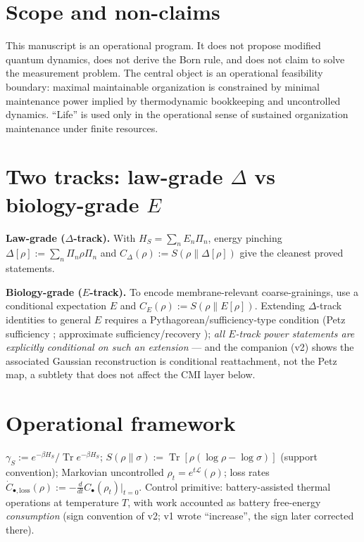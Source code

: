 \documentclass[11pt,a4paper]{article}
\theoremstyle{plain}
\theoremstyle{definition}
\theoremstyle{remark}
\newcommand{\Tr}{\operatorname{Tr}}
\begin{document}
\section{Scope and non-claims}

This manuscript is an operational program. It does not propose modified
quantum dynamics, does not derive the Born rule, and does not claim to solve
the measurement problem. The central object is an operational feasibility
boundary: maximal maintainable organization is constrained by minimal
maintenance power implied by thermodynamic bookkeeping and uncontrolled
dynamics. ``Life'' is used only in the operational sense of sustained
organization maintenance under finite resources.

\section{Two tracks: law-grade $\Delta$ vs biology-grade $E$}

\textbf{Law-grade ($\Delta$-track).} With $H_S = \sum_n E_n\Pi_n$, energy
pinching $\Delta[\rho] := \sum_n\Pi_n\rho\Pi_n$ and $C_\Delta(\rho) :=
S(\rho\|\Delta[\rho])$ give the cleanest proved statements.

\textbf{Biology-grade ($E$-track).} To encode membrane-relevant
coarse-grainings, use a conditional expectation $E$ and $C_E(\rho) :=
S(\rho\|E[\rho])$. Extending $\Delta$-track identities to general $E$ requires
a Pythagorean/sufficiency-type condition (Petz sufficiency \cite{Petz86};
approximate sufficiency/recovery \cite{JRSWW18}); \emph{all $E$-track power
statements are explicitly conditional on such an extension} --- and the
companion \cite{Clustering} (v2) shows the associated Gaussian reconstruction
is conditional reattachment, not the Petz map, a subtlety that does not affect
the CMI layer below.

\section{Operational framework}

$\gamma_S := e^{-\beta H_S}/\Tr e^{-\beta H_S}$; $S(\rho\|\sigma) :=
\Tr[\rho(\log\rho-\log\sigma)]$ (support convention); Markovian uncontrolled
$\rho_t = e^{t\mathcal{L}}(\rho)$; loss rates
$\dot{C}_{\bullet,\mathrm{loss}}(\rho) :=
-\frac{d}{dt}C_\bullet(\rho_t)|_{t=0}$. Control primitive:
battery-assisted thermal operations at temperature $T$, with work accounted
as battery free-energy \emph{consumption} (sign convention of \cite{Work}
v2; v1 wrote ``increase'', the sign later corrected there).
\end{document}
